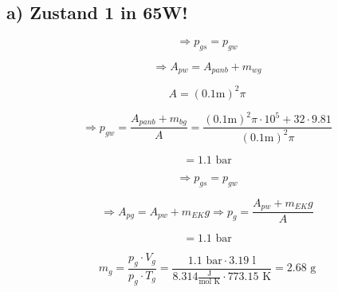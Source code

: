 \subsection*{a) Zustand 1 in 65W!}

\[
\Rightarrow p_{gs} = p_{gw}
\]

\[
\Rightarrow A_{pw} = A_{panb} + m_{wg}
\]

\[
A = (0.1 \text{m})^2 \pi
\]

\[
\Rightarrow p_{gw} = \frac{A_{panb} + m_{bg}}{A} = \frac{(0.1 \text{m})^2 \pi \cdot 10^5 + 32 \cdot 9.81}{(0.1 \text{m})^2 \pi}
\]

\[
= 1.1 \text{ bar}
\]

\[
\Rightarrow p_{gs} = p_{gw}
\]

\[
\Rightarrow A_{pg} = A_{pw} + m_{EK} g \Rightarrow p_{g} = \frac{A_{pw} + m_{EK} g}{A}
\]

\[
= 1.1 \text{ bar}
\]

\[
m_{g} = \frac{p_{g} \cdot V_{g}}{p_{g} \cdot T_{g}} = \frac{1.1 \text{ bar} \cdot 3.19 \text{ l}}{8.314 \frac{\text{J}}{\text{mol K}} \cdot 773.15 \text{ K}} = 2.68 \text{ g}
\]